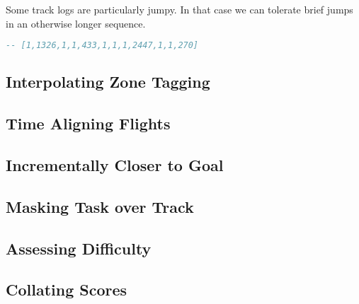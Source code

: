 \documentclass[gap.tex]{subfiles}
\begin{document}
Some track logs are particularly jumpy. In that case we can tolerate brief
jumps in an otherwise longer sequence.

\begin{lstlisting}[language=Haskell, caption={Example of a jumpy track log.}]
-- [1,1326,1,1,433,1,1,1,2447,1,1,270]
\end{lstlisting}

\subsection{Interpolating Zone Tagging}
\subsection{Time Aligning Flights}
\subsection{Incrementally Closer to Goal}
\subsection{Masking Task over Track}
\subsection{Assessing Difficulty}
\subsection{Collating Scores}
\end{document}
